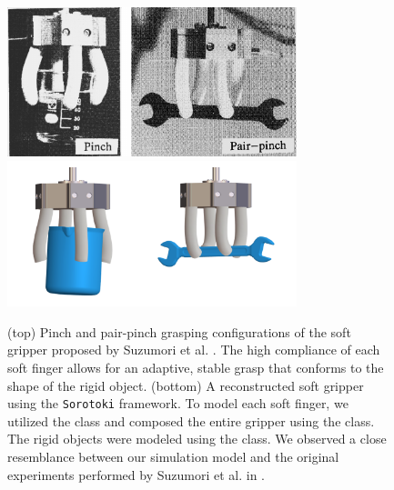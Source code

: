 \begin{figure}[!t]
    \centering
    \includegraphics*[width=0.75\textwidth]{./pdf/thesis-figure-6-26-1.pdf}
    \includegraphics*[width=0.75\textwidth]{./pdf/thesis-figure-6-26-2.pdf}
    \caption{\small (top) Pinch and pair-pinch grasping configurations of the soft gripper proposed by Suzumori et al. \cite{Suzumori1992, Suzumori1991}. The high compliance of each soft finger allows for an adaptive, stable grasp that conforms to the shape of the rigid object. (bottom) A reconstructed soft gripper using the \texttt{Sorotoki} framework. To model each soft finger, we utilized the  class and composed the entire gripper using the  class. The rigid objects were modeled using the  class. We observed a close resemblance between our simulation model and the original experiments performed by Suzumori et al. in \cite{Suzumori1991, Suzumori1992}.}
    \label{fig:C5:suzumori_gripper_grasp}
    \vspace{-3mm}
\end{figure}

